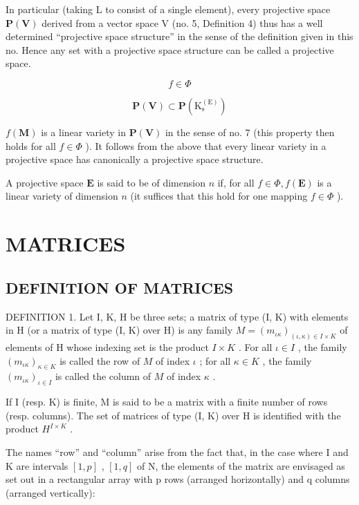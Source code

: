 In particular (taking L to consist of a single element), every projective space \(\mathbf{P}(\mathbf{V})\) derived from a vector space V (no. 5, Definition 4) thus has a well determined ``projective space structure'' in the sense of the definition given in this no. Hence any set with a projective space structure can be called a projective space.

\[
f \in \Phi
\]

\[
\mathbf {P} (\mathbf {V}) \subset \mathbf {P} \left(\mathrm{K} _ {\mathrm{s}} ^ {(\mathrm{E})}\right)
\]

\(f(\mathbf{M})\) is a linear variety in \(\mathbf{P}(\mathbf{V})\) in the sense of no. 7 (this property then holds for all \(f \in \Phi\) ). It follows from the above that every linear variety in a projective space has canonically a projective space structure.

A projective space \(\mathbf{E}\) is said to be of dimension \(n\) if, for all \(f\in\Phi,f(\mathbf{E})\) is a linear variety of dimension \(n\) (it suffices that this hold for one mapping \(f\in\Phi\) ).

\section{MATRICES}

\subsection{DEFINITION OF MATRICES}

DEFINITION 1. Let I, K, H be three sets; a matrix of type (I, K) with elements in H (or a matrix of type (I, K) over H) is any family \(M = (m_{\iota\kappa})_{(\iota, \kappa) \in I \times K}\) of elements of H whose indexing set is the product \(I \times K\) . For all \(\iota \in I\) , the family \((m_{\iota\kappa})_{\kappa \in K}\) is called the row of \(M\) of index \(\iota\) ; for all \(\kappa \in K\) , the family \((m_{\iota\kappa})_{\iota \in I}\) is called the column of \(M\) of index \(\kappa\) .

If I (resp. K) is finite, M is said to be a matrix with a finite number of rows (resp. columns). The set of matrices of type (I, K) over H is identified with the product \(H^{I \times K}\) .

The names ``row'' and ``column'' arise from the fact that, in the case where I and K are intervals \([1,p]\) , \([1,q]\) of N, the elements of the matrix are envisaged as set out in a rectangular array with p rows (arranged horizontally) and q columns (arranged vertically):

